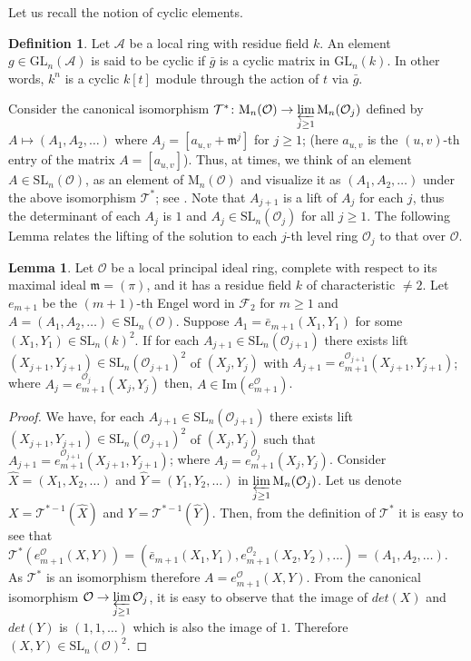 \documentclass[10pt,twoside]{amsart}
\newcommand{\GL}{\mathrm{GL}}
\newcommand{\SL}{\mathrm{SL}}
\newcommand{\M}{\mathrm{M}}
\newcommand{\im}{\mathrm{Im}}
\newcommand{\R}{\mathcal{O}_2}
\theoremstyle{definition}
\newtheorem{definition}[theorem]{Definition}
\theoremstyle{definition}
\newtheorem{lemma}[theorem]{Lemma}
\begin{document}
Let us recall the notion of cyclic elements.
\begin{definition}
Let $\mathcal{A}$ be a local ring with residue field $k$. An element $g\in \GL_n(\mathcal{A})$ is said to be cyclic if $\bar g$ is a cyclic matrix in $\GL_n(k)$. In other words, $k^n$ is a cyclic $k[t]$ module through the action of $t$ via $\bar g$. 
\end{definition}
Consider the canonical isomorphism $\mathcal{T^*} \colon  \M_n(\mathcal{O}) \rightarrow \varprojlim\limits _{j\geq 1} \M_n(\mathcal{O}_j)$ defined by $A\mapsto (A_1,A_2,\ldots )$ where $A_j=[a_{u,v}  + \mathfrak{m}^j]$ for $j\geq 1$; (here $a_{u,v}$ is the $(u,v)$-th entry of the matrix $A=[a_{u,v}]$). Thus, at times, we think of an element $A\in \SL_n(\mathcal{O})$, as an element of $\M_n(\mathcal{O})$ and visualize it as $(A_1,A_2,\ldots)$ under the above isomorphism $\mathcal{T}^*$; see \cite[section 2]{PRS2026}. Note that $A_{j+1}$ is a lift of $A_j$ for each $j$, thus the determinant of each $A_j$ is $1$ and $A_j\in \SL_n(\mathcal{O}_j)$ for all $j\geq 1$.
The following Lemma relates the lifting of the solution to each $j$-th level ring $\mathcal O_{j}$ to that over $\mathcal O$. 
\begin{lemma}{\label{lifting complete level}}
Let $\mathcal{O}$ be a local principal ideal ring, complete with respect to its maximal ideal $\mathfrak{m}=(\pi)$, and it has a residue field $k$ of characteristic $\neq 2$. Let $e_{m+1}$ be the $(m+1)$-th Engel word in $\mathcal{F}_2$ for $m\geq 1$ and $A=(A_1, A_2, \ldots) \in \SL_n(\mathcal{O})$. Suppose $A_1 = \bar e_{m+1}(X_1, Y_1)$ for some $(X_1, Y_1)\in \SL_n(k)^2$. If for each $A_{j+1}\in \SL_n(\mathcal{O}_{j+1})$ there exists lift  $(X_{j+1}, Y_{j+1})\in \SL_n(\mathcal{O}_{j+1})^2$ of $(X_j, Y_j)$ with $A_{j+1} = e_{m+1}^{\mathcal{O}_{j+1}}(X_{j+1},Y_{j+1})$;  where $A_j=e_{m+1}^{\mathcal{O}_j}(X_j,Y_j)$ then, $A\in  \im(e_{m+1}^{\mathcal{O}})$.  
\end{lemma}
\begin{proof}
We have, for each $A_{j+1}\in \SL_n(\mathcal{O}_{j+1})$ there exists lift  $(X_{j+1},Y_{j+1})\in \SL_n(\mathcal{O}_{j+1})^2$ of $(X_j,Y_j)$ such that $A_{j+1}=e_{m+1}^{\mathcal{O}_{j+1}}(X_{j+1}, Y_{j+1})$; where $A_j = e_{m+1}^{\mathcal{O}_j}(X_j, Y_j)$. Consider $\widehat{X}=(X_1, X_2,\ldots)$ and $\widehat{Y} = (Y_1, Y_2,\ldots)$ in $\varprojlim\limits _{j\geq 1} \M_n(\mathcal{O}_j)$. Let us denote $X=\mathcal{T}^{*-1}(\widehat{X})$ and $Y = \mathcal{T}^{*-1}(\widehat{Y})$. Then, from the definition of $\mathcal{T}^*$ it is easy to see that $\mathcal{T}^*(e_{m+1}^{\mathcal{O}}(X, Y))=(\bar e_{m+1}(X_1, Y_1), e_{m+1}^{\R}(X_2, Y_2),\ldots) = (A_1, A_2,\ldots)$. As $\mathcal{T}^*$ is an isomorphism therefore $A = e_{m+1}^{\mathcal{O}}(X, Y)$. From the canonical isomorphism $\mathcal{O} \rightarrow \varprojlim\limits_{j\geq 1}\mathcal{O}_j$, it is easy to observe that the image of $det(X)$ and $det(Y)$ is $(1,1,\ldots)$ which is also the image of $1$. Therefore $(X, Y)\in \SL_n(\mathcal{O})^2$.
\end{proof}
\end{document}
